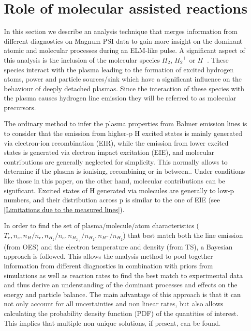 \section{Role of molecular assisted reactions}\label{Role of molecular assisted reactions}
In this section we describe an analysis technique that merges information from different diagnostics on Magnum-PSI data to gain more insight on the dominant atomic and molecular processes during an ELM-like pulse. A significant aspect of this analysis is the inclusion of the molecular species $H_2$, ${H_2}^+$ or $H^-$. These species interact with the plasma leading to the formation of excited hydrogen atoms, power and particle sources/sink which have a significant influence on the behaviour of deeply detached plasmas. Since the interaction of these species with the plasma causes hydrogen line emission they will be referred to as molecular precursors.

The ordinary method to infer the plasma properties from Balmer emission lines is to consider that the emission from higher-p H excited states is mainly generated via electron-ion recombination (EIR), while the emission from lower excited states is generated via electron impact excitation (EIE), and molecular contributions are generally neglected for simplicity. This normally allows to determine if the plasma is ionising, recombining or in between.\cite{Potzel2012,Verhaegh2019}. Under conditions like those in this paper, on the other hand, molecular contributions can be significant.\cite{Akkermans2020} Excited states of H generated via molecules are generally to low-p numbers, and their distribution across p is similar to the one of EIE (see \autoref{Limitations due to the measured lines}). 

In order to find the set of plasma/molecule/atom characteristics ($T_e, n_e, n_{H}/n_e, n_{H_2}/n_e, n_{{H_2}_+}/n_{H_2}, n_{{H}^-}/n_{H_2}$) that best match both the line emission (from OES) and the electron temperature and density (from TS), a Bayesian approach is followed. This allows the analysis method to pool together information from different diagnostics in combination with priors from simulations as well as reaction rates to find the best match to experimental data and thus derive an understanding of the dominant processes and effects on the energy and particle balance. The main advantage of this approach is that it can not only account for all uncertainties and non linear rates, but also allows calculating the probability density function (PDF) of the quantities of interest. This implies that multiple non unique solutions, if present, can be found.

